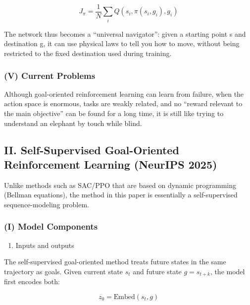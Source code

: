 \[
J_\pi
=
\frac{1}{N}
\sum_i
Q(s_i,\pi(s_i,g_i),g_i)
\]

The network thus becomes a ``universal navigator'': given a starting point s and destination g, it can use physical laws to tell you how to move, without being restricted to the fixed destination used during training.

\hypertarget{v-current-problems}{%
\subsubsection{(V) Current Problems}\label{v-current-problems}}

Although goal-oriented reinforcement learning can learn from failure, when the action space is enormous, tasks are weakly related, and no ``reward relevant to the main objective'' can be found for a long time, it is still like trying to understand an elephant by touch while blind.

\hypertarget{ii.-self-supervised-goal-oriented-reinforcement-learning-neurips-2025}{%
\subsection{II. Self-Supervised Goal-Oriented Reinforcement Learning (NeurIPS 2025)}\label{ii.-self-supervised-goal-oriented-reinforcement-learning-neurips-2025}}

Unlike methods such as SAC/PPO that are based on dynamic programming (Bellman equations), the method in this paper is essentially a self-supervised sequence-modeling problem.

\hypertarget{i-model-components-1}{%
\subsubsection{(I) Model Components}\label{i-model-components-1}}

\begin{enumerate}
\def\labelenumi{\arabic{enumi}.}
\tightlist
\item
  Inputs and outputs
\end{enumerate}

The self-supervised goal-oriented method treats future states in the same trajectory as goals. Given current state \(s_t\) and future state \(g=s_{t+k}\), the model first encodes both:

\[
z_0=\mathrm{Embed}(s_t,g)
\]

